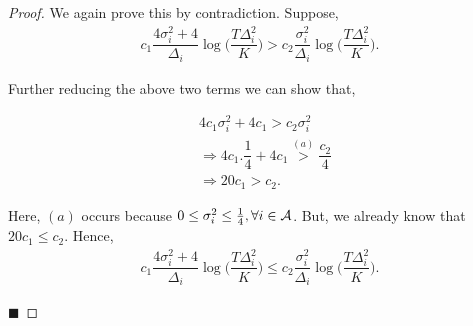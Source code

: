 \begin{proof}
We again prove this by contradiction. Suppose, 
\begin{align*}
c_1 \dfrac{4\sigma_i^2 + 4}{\Delta_i}\log\bigg( \dfrac{T\Delta_i^2}{K}\bigg) > c_2 \dfrac{\sigma_i^2}{\Delta_i}\log\bigg( \dfrac{T\Delta_i^2}{K}\bigg).
\end{align*}

Further reducing the above two terms we can show that, 

\begin{align*}
& 4c_1\sigma_i^2 + 4c_1 > c_2\sigma_i^2\\
& \Rightarrow 4c_1.\dfrac{1}{4} + 4c_1 \overset{(a)}{>} \dfrac{c_2}{4}\\
& \Rightarrow 20 c_1 > c_2.
\end{align*}

Here, $(a)$ occurs because $0\leq\sigma_i^2 \leq \frac{1}{4},\forall i\in \mathcal{A}$. But, we already know that $20 c_1 \leq c_2$. Hence, 
\begin{align*}
c_1 \dfrac{4\sigma_i^2 + 4}{\Delta_i}\log\bigg( \dfrac{T\Delta_i^2}{K}\bigg) \leq c_2 \dfrac{\sigma_i^2}{\Delta_i}\log\bigg( \dfrac{T\Delta_i^2}{K}\bigg).
\end{align*}

\hfill $\blacksquare$	
\end{proof}



%
%




